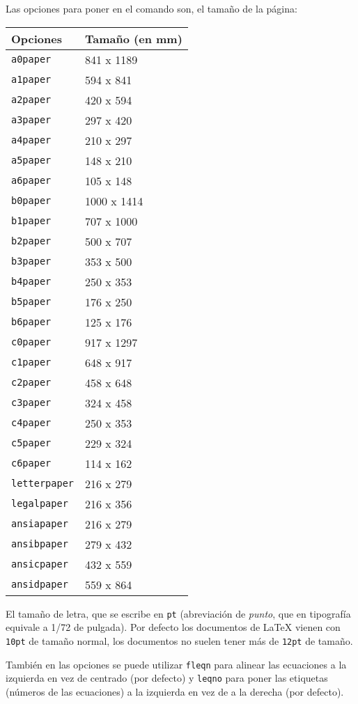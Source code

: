 \documentclass[11pt,oneside,letterpaper]{book}
\theoremstyle{custom}
\theoremstyle{definition}
\begin{document}
Las opciones para poner en el comando son, el tamaño de la página:
\begin{longtable}{ll}
\hline Opciones & Tamaño (en mm)\\
\hline \texttt{a0paper} & 841 x 1189\\
\texttt{a1paper} & 594 x 841\\
\texttt{a2paper} & 420 x 594\\
\texttt{a3paper} & 297 x 420\\
\texttt{a4paper} & 210 x 297\\
\texttt{a5paper} & 148 x 210\\
\texttt{a6paper} & 105 x 148\\
\texttt{b0paper} & 1000 x 1414\\
\texttt{b1paper} & 707 x 1000\\
\texttt{b2paper} & 500 x 707\\
\texttt{b3paper} & 353 x 500\\
\texttt{b4paper} & 250 x 353\\
\texttt{b5paper} & 176 x 250\\
\texttt{b6paper} & 125 x 176\\
\texttt{c0paper} & 917 x 1297\\
\texttt{c1paper} & 648 x 917\\
\texttt{c2paper} & 458 x 648\\
\texttt{c3paper} & 324 x 458\\
\texttt{c4paper} & 250 x 353\\
\texttt{c5paper} & 229 x 324\\
\texttt{c6paper} & 114 x 162\\
\texttt{letterpaper} & 216 x 279\\
\texttt{legalpaper} & 216 x 356\\
\texttt{ansiapaper} & 216 x 279\\
\texttt{ansibpaper} & 279 x 432\\
\texttt{ansicpaper} & 432 x 559\\
\texttt{ansidpaper} & 559 x 864\\ \hline
\end{longtable}
El tamaño de letra, que se escribe en \texttt{pt} (abreviación de \textit{punto}, que en tipografía equivale a 1/72 de pulgada). Por defecto los documentos de \LaTeX{} vienen con \texttt{10pt} de tamaño normal, los documentos no suelen tener más de \texttt{12pt} de tamaño.

También en las opciones se puede utilizar \texttt{fleqn} para alinear las ecuaciones a la izquierda en vez de centrado (por defecto) y \texttt{leqno} para poner las etiquetas (números de las ecuaciones) a la izquierda en vez de a la derecha (por defecto).
\end{document}
